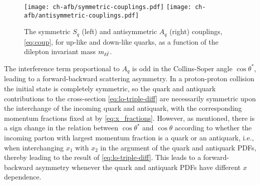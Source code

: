  
\begin{figure}
  \centering
  \texttt{[image: ch-afb/symmetric-couplings.pdf]}
  \texttt{[image: ch-afb/antisymmetric-couplings.pdf]}
  \caption{The symmetric $S_q$ (left) and antisymmetric $A_q$ (right)
    couplings, \cref{eq:coup}, for up-like and
    down-like quarks, as a function of 
 the dilepton invariant mass $m_{\ell\bar{\ell}}$.
  }
  \label{fig:lo-couplings}
\end{figure}

The interference term proportional to
$A_q$ is odd in the Collins-Soper angle $\cos\theta^*$, leading to a forward-backward
scattering asymmetry.
%
In a proton-proton collision the initial state is completely
symmetric, so the quark and antiquark contributions to the
cross-section \cref{eq:lo-triple-diff} are necessarily symmetric
upon the interchange of the incoming quark and antiquark, with the
corresponding momentum fractions fixed at \lo by
\cref{eq:x_fractions}.
%
However, as mentioned, there
is a sign change in the relation between $\cos\theta^*$ and
$\cos\theta$ according to whether the incoming parton with largest
momentum fraction is a quark or an antiquark, i.e.,
when interchanging
$x_1$ with $x_2$ in the argument of the quark and antiquark PDFs,
thereby leading to the result of  \cref{eq:lo-triple-diff}.
%
This leads
to a forward-backward asymmetry whenever the quark and antiquark
PDFs have different $x$ dependence.

